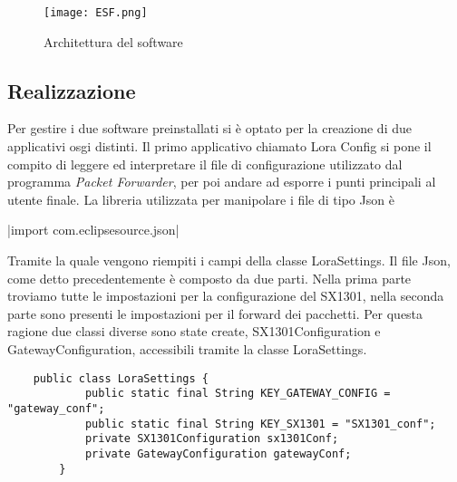 \begin{figure}[h]
\centering 
\texttt{[image: ESF.png]}
\caption{Architettura del software}
\label{fig:Software_stack}
\end{figure}

\subsection{Realizzazione}
Per gestire i due software preinstallati si è optato per la creazione di due
applicativi osgi distinti.
Il primo applicativo chiamato Lora Config si pone il compito di leggere ed
interpretare il file di configurazione utilizzato dal programma \emph{Packet
Forwarder}, per poi andare ad esporre i punti principali al utente finale.
La libreria utilizzata per manipolare i file di tipo Json è 

|import com.eclipsesource.json|

Tramite la quale vengono riempiti i campi della classe LoraSettings. Il file
Json, come detto precedentemente è composto da due parti. Nella prima parte
troviamo tutte le impostazioni per la configurazione del SX1301, nella seconda
parte sono presenti le impostazioni per il forward dei pacchetti. Per questa
ragione due classi diverse sono state create, SX1301Configuration e
GatewayConfiguration, accessibili tramite la classe LoraSettings.

\begin{verbatim}
    public class LoraSettings {
            public static final String KEY_GATEWAY_CONFIG = "gateway_conf";
            public static final String KEY_SX1301 = "SX1301_conf";
            private SX1301Configuration sx1301Conf;
            private GatewayConfiguration gatewayConf;
        }
\end{verbatim}

